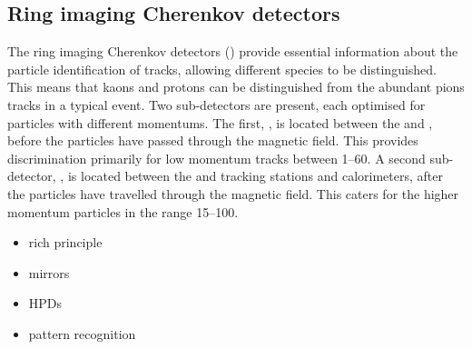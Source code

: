 \subsection{Ring imaging Cherenkov detectors}

The ring imaging Cherenkov detectors (\rich) provide essential information about the particle identification of tracks, allowing different species to be distinguished. This means that kaons and protons can be distinguished from the abundant pions tracks in a typical event. Two \rich sub-detectors are present, each optimised for particles with different momentums. The first, \richone, is located between the \velo and \ttracker, before the particles have passed through the magnetic field. This provides discrimination primarily for low momentum tracks between 1--60\gevc. A second sub-detector, \richtwo, is located between the \intr and \ot tracking stations and calorimeters, after the particles have travelled through the magnetic field. This caters for the higher momentum particles in the range 15--100\gevc. 


{\color{Red}
\begin{itemize}
\item rich principle 
\item mirrors
\item HPDs
\item pattern recognition 
\end{itemize}
}

